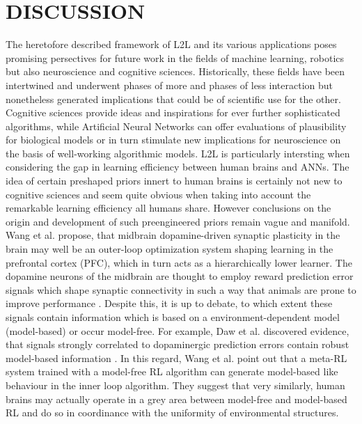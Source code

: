 \documentclass[letterpaper, 10 pt, conference]{ieeeconf}  %
\begin{document}
\section{DISCUSSION}
 
The heretofore described framework of L2L and its various applications poses promising persectives for future work in the fields 
of machine learning, robotics but also neuroscience and cognitive sciences. Historically, these fields have been intertwined and underwent
phases of more and phases of less interaction but nonetheless generated implications that could be of scientific use for the other. Cognitive 
sciences provide ideas and inspirations for ever further sophisticated algorithms, while Artificial Neural Networks can offer evaluations of 
plausibility for biological models or in turn stimulate new implications for neuroscience on the basis of well-working algorithmic models. L2L
is particularly intersting when considering the gap in learning efficiency between human brains and ANNs. The idea of certain preshaped 
priors innert to human brains is certainly not new to cognitive sciences and seem quite obvious when taking into account the remarkable 
learning efficiency all humans share. However conclusions on the origin and development of such preengineered priors remain vague
and manifold. Wang et al.\cite{wangPrefrontalCortexMetareinforcement2018} propose,
that midbrain dopamine-driven synaptic plasticity in the brain may well be an outer-loop optimization system shaping 
learning in the prefrontal cortex (PFC), 
which in turn acts as a hierarchically lower learner. The dopamine neurons of the midbrain are thought to employ reward prediction 
error signals which shape synaptic connectivity in such a way that animals are prone to improve performance 
\cite{montagueFrameworkMesencephalicDopamine1996}. Despite this, it is 
up to debate, to which extent these signals contain information which is based on a environment-dependent model (model-based) or occur model-free.
For example, Daw et al.\cite{dawModelbasedInfluencesHumans2011} discovered evidence, that signals strongly correlated to 
dopaminergic prediction errors contain robust model-based
information \cite{botvinickReinforcementLearningFast2019}\cite{dawModelbasedInfluencesHumans2011}.
In this regard, Wang et al.\cite{wangPrefrontalCortexMetareinforcement2018} point out that a meta-RL system trained with a model-free RL algorithm 
can generate model-based like behaviour in the inner loop algorithm. They suggest that very similarly, 
human brains may actually operate in a grey area between 
model-free and model-based RL and do so in coordinance with the uniformity of environmental structures. \newline
\end{document}
